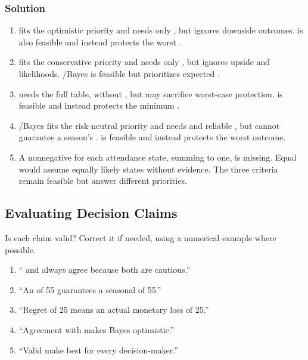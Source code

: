 \subsubsection*{Solution}
\begin{enumerate}
\item {} fits the optimistic priority and needs only , but ignores downside outcomes.  is also feasible and instead protects the worst .
\item {} fits the conservative priority and needs only , but ignores upside and likelihoods. /Bayes is feasible but prioritizes expected .
\item {}  needs the full  table, without , but may sacrifice worst-case protection.  is feasible and instead protects the minimum .
\item {}/Bayes fits the risk-neutral priority and needs  and reliable , but cannot guarantee a season's .  is feasible and instead protects the worst outcome.
\item A nonnegative  for each attendance state, summing to one, is missing. Equal  would assume equally likely states without evidence. The three  criteria remain feasible but answer different priorities.
\end{enumerate}

\subsection{Evaluating Decision Claims}\label{sec:c8-critique}
Is each claim valid? Correct it if needed, using a numerical example where possible.
\begin{enumerate}
\item `` and   always agree because both are cautious.''
\item ``An  of 55 guarantees a seasonal  of 55.''
\item ``Regret of 25 means an actual monetary loss of 25.''
\item ``Agreement with  makes Bayes optimistic.''
\item ``Valid  make  best for every decision-maker.''
\end{enumerate}
